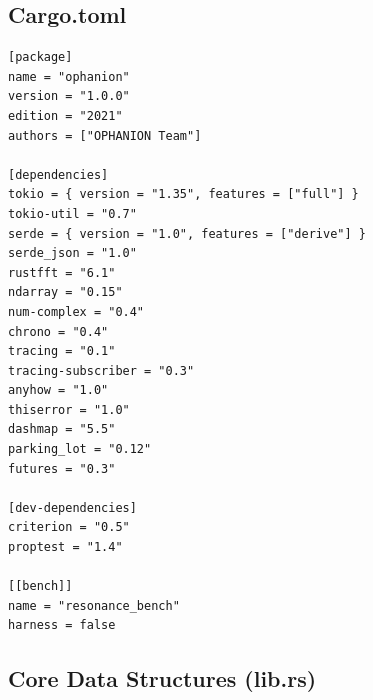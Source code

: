 \documentclass[11pt,a4paper]{article}
\begin{document}
\subsection{Cargo.toml}

\begin{lstlisting}[style=rust]
[package]
name = "ophanion"
version = "1.0.0"
edition = "2021"
authors = ["OPHANION Team"]

[dependencies]
tokio = { version = "1.35", features = ["full"] }
tokio-util = "0.7"
serde = { version = "1.0", features = ["derive"] }
serde_json = "1.0"
rustfft = "6.1"
ndarray = "0.15"
num-complex = "0.4"
chrono = "0.4"
tracing = "0.1"
tracing-subscriber = "0.3"
anyhow = "1.0"
thiserror = "1.0"
dashmap = "5.5"
parking_lot = "0.12"
futures = "0.3"

[dev-dependencies]
criterion = "0.5"
proptest = "1.4"

[[bench]]
name = "resonance_bench"
harness = false
\end{lstlisting}

\subsection{Core Data Structures (lib.rs)}
\end{document}
